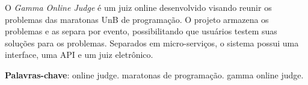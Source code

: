 \begin{resumo}

    O \textit{Gamma Online Judge} é um juiz online desenvolvido visando reunir os problemas das maratonas UnB de programação. O projeto armazena os problemas e as separa por evento, possibilitando que usuários testem suas soluções para os problemas. Separados em micro-serviços, o sistema possui uma interface, uma API e um juiz eletrônico.

 \vspace{\onelineskip}
    
 \noindent
 \textbf{Palavras-chave}: online judge. maratonas de programação. gamma online judge.
\end{resumo}
 
